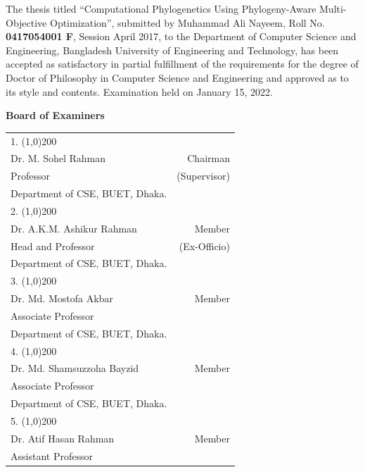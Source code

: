 \begin{singlespace}
\small{
 The thesis titled ``Computational Phylogenetics Using Phylogeny-Aware Multi-Objective Optimization'', submitted by Muhammad Ali Nayeem, Roll No.
 \textbf{0417054001 F}, Session April 2017, to the Department of Computer Science
 and Engineering, Bangladesh University of Engineering and Technology, has been accepted as satisfactory 
 in partial fulfillment of the requirements for the degree of Doctor of Philosophy in Computer Science and Engineering and approved as to its style and contents. Examination held on January 15, 2022. \\ 
 
 \begin{spacing}{0.5}	
 \begin{center}
 	\textbf{\Large Board of Examiners}
 \end{center}
 \begin{tabular}{p{12cm} r }
 	\vspace{0.1cm}
 	1. \line(1,0){200} &  \\
 	Dr. M. Sohel Rahman & Chairman\\ 
 	Professor & (Supervisor)\\
 	Department of CSE, BUET, Dhaka.  & \\
 	\vspace{0.1cm}
 	2. \line(1,0){200} &  \\
 	Dr. A.K.M. Ashikur Rahman & Member\\ 
 	Head and Professor & (Ex-Officio)\\
  	Department of CSE, BUET, Dhaka.  & \\
 	\vspace{0.1cm}
 	3. \line(1,0){200} &  \\
 	Dr. Md. Mostofa Akbar & Member\\ 
 	Associate Professor & \\
 	Department of CSE, BUET, Dhaka.  & \\
 	\vspace{0.1cm}
 	4. \line(1,0){200} &  \\
 	Dr. Md. Shamsuzzoha Bayzid  & Member\\ 
 	Associate Professor & \\
 	Department of CSE, BUET, Dhaka.  & \\
 	\vspace{0.1cm}
 	5. \line(1,0){200} &  \\
 	Dr. Atif Hasan Rahman  & Member\\ 
 	Assistant Professor & \\

\end{tabular}
\end{spacing}}
\end{singlespace}
